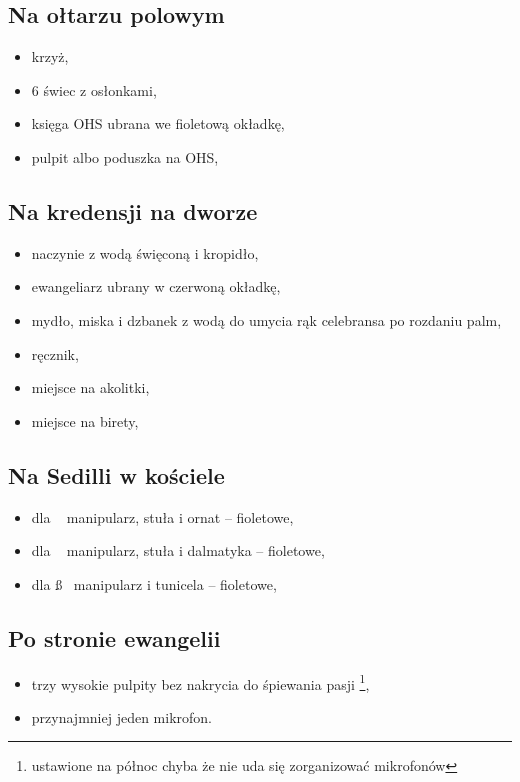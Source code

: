 		\subsection{Na ołtarzu polowym}
			
			\begin{itemize}
				\item krzyż,
				\item 6 świec z osłonkami,
				\item księga OHS ubrana we {\color{violet}fioletową} okładkę,
				\item pulpit albo poduszka na OHS,
			\end{itemize}
		
		\subsection{Na kredensji na dworze}
			
			\begin{itemize}
				\item naczynie z wodą święconą i kropidło,
				\item ewangeliarz ubrany w {\color{red}czerwoną} okładkę,
				\item mydło, miska i dzbanek z wodą do umycia rąk celebransa po rozdaniu palm,
				\item ręcznik,
				\item miejsce na akolitki,
				\item miejsce na birety,
			\end{itemize}
		
		\subsection{Na Sedilli w kościele}
		
			\begin{itemize}
				\item dla \ii~ manipularz, stuła i ornat – {\color{violet}fioletowe},
				\item dla \dd~ manipularz, stuła i dalmatyka – {\color{violet}fioletowe},
				\item dla \ss~ manipularz i tunicela – {\color{violet}fioletowe},
			\end{itemize}
	
		\subsection{Po stronie ewangelii}
			
			\begin{itemize}
				\item trzy wysokie pulpity bez nakrycia do śpiewania pasji \footnote{ustawione na północ chyba że nie uda się zorganizować mikrofonów},
				\item przynajmniej jeden mikrofon.
			\end{itemize}
